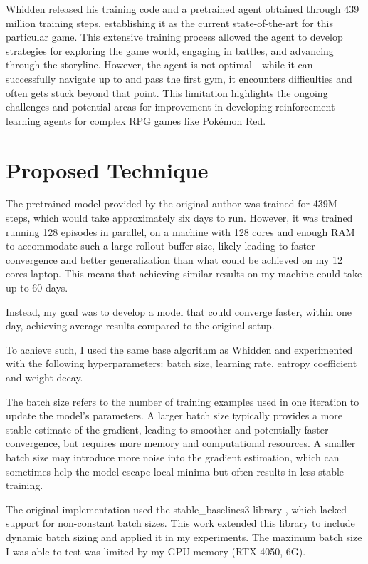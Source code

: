 \documentclass[10pt,conference]{IEEEtran}
\begin{document}
Whidden released his training code and a pretrained agent obtained through 439 million training steps, establishing it as the current state-of-the-art for this particular game. This extensive training process allowed the agent to develop strategies for exploring the game world, engaging in battles, and advancing through the storyline. However, the agent is not optimal - while it can successfully navigate up to and pass the first gym, it encounters difficulties and often gets stuck beyond that point. This limitation highlights the ongoing challenges and potential areas for improvement in developing reinforcement learning agents for complex RPG games like Pokémon Red.



\newpage



\section{Proposed Technique}

The pretrained model provided by the original author was trained for 439M steps, which would take approximately six days to run. However, it was trained running 128 episodes in parallel, on a machine with 128 cores and enough RAM to accommodate such a large rollout buffer size, likely leading to faster convergence and better generalization than what could be achieved on my 12 cores laptop. This means that achieving similar results on my machine could take up to 60 days.

Instead, my goal was to develop a model that could converge faster, within one day, achieving average results compared to the original setup. 

To achieve such, I used the same base algorithm as Whidden and experimented with the following hyperparameters: batch size, learning rate, entropy coefficient and weight decay.

The batch size refers to the number of training examples used in one iteration to update the model's parameters. A larger batch size typically provides a more stable estimate of the gradient, leading to smoother and potentially faster convergence, but requires more memory and computational resources. A smaller batch size may introduce more noise into the gradient estimation, which can sometimes help the model escape local minima but often results in less stable training.

The original implementation used the stable\_baselines3 library \cite{ref:stable-baselines3}, which lacked support for non-constant batch sizes. This work extended this library to include dynamic batch sizing and applied it in my experiments. The maximum batch size I was able to test was limited by my GPU memory (RTX 4050, 6G).
\end{document}

